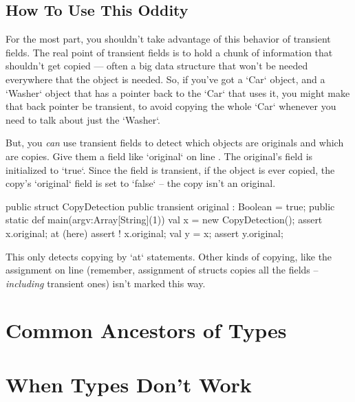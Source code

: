 \subsection{How To Use This Oddity}

For the most part, you shouldn't take advantage of this behavior of transient
fields.  The real point of transient fields is to hold a chunk of information
that shouldn't get copied --- often a big data structure that won't be needed
everywhere that the object is needed. So, if you've got a \xcd`Car` object,
and a \xcd`Washer` object that has a pointer back to the \xcd`Car` that uses
it,  you might make that back pointer be transient, to avoid copying the whole
\xcd`Car` whenever you need to talk about just the \xcd`Washer`. 

But, you {\em can} use transient fields to detect which objects are originals
and which are copies. 
Give them a field like \xcd`original` on line .  
The original's field is initialized to \xcd`true`.    Since the field is
transient, if the object is ever copied, the copy's \xcd`original` field is
set to \xcd`false` -- the copy isn't an original.
\begin{xtennum}[]
public struct CopyDetection {
  public transient original : Boolean = true; 
  public static def main(argv:Array[String](1)) {
     val x = new CopyDetection();
     assert x.original;  
     at (here) {
       assert ! x.original; 
     }
     val y = x;
     assert y.original; 
  }
}
\end{xtennum}

This only detects copying by \xcd`at` statements.  Other kinds of copying,
like the assignment on line  (remember, assignment of
structs copies all the fields -- {\em including} transient ones) isn't marked
this way.  







\section{Common Ancestors of Types}
\section{When Types Don't Work}

